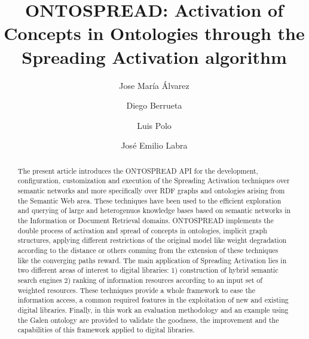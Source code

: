 \documentclass{llncs}
\begin{document}
\title{ONTOSPREAD: Activation of Concepts in Ontologies through the Spreading
Activation algorithm}


\author{Jose Mar\'{i}a \'{A}lvarez \and Diego Berrueta \and Luis Polo
 \and Jos\'{e} Emilio Labra} 







\maketitle

\begin{abstract}
The present article introduces the ONTOSPREAD API for the development,
configuration, customization and execution of the Spreading Activation
techniques over semantic networks and more specifically over RDF graphs and ontologies 
arising from the Semantic Web area. These techniques have been used to
the efficient exploration and querying of large and heterogenuos knowledge bases 
based on semantic networks in the Information or Document Retrieval domains. 
ONTOSPREAD implements the double process of activation and spread of concepts in ontologies, implicit
graph structures, applying different restrictions of the original model like weight degradation 
according to the distance or others comming from the extension of these techniques like
the converging paths reward. The main application of Spreading Activation
lies in two different areas of interest to digital libraries: 1) construction of hybrid semantic search engines 2) ranking of
information resources according to an input set of weighted resources. These techniques provide a whole framework to ease
the information access, a common required features in the exploitation
of new and existing digital libraries. Finally, in this work an evaluation methodology and 
an example using the Galen ontology are provided to validate the goodness, the improvement and the capabilities of 
this framework applied to digital libraries.
\end{abstract}
\end{document}
